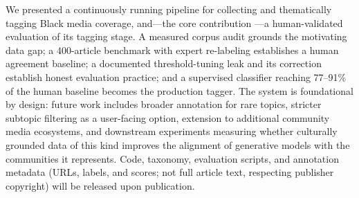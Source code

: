\documentclass[letterpaper,twocolumn,10pt]{article}
\begin{document}
We presented a continuously running pipeline for collecting and
thematically tagging Black media coverage, and---the core contribution
---a human-validated evaluation of its tagging stage. A measured corpus
audit grounds the motivating data gap; a 400-article benchmark with
expert re-labeling establishes a human agreement baseline; a documented
threshold-tuning leak and its correction establish honest evaluation
practice; and a supervised classifier reaching 77--91\% of the human
baseline becomes the production tagger. The system is foundational by
design: future work includes broader annotation for rare topics,
stricter subtopic filtering as a user-facing option, extension to
additional community media ecosystems, and downstream experiments
measuring whether culturally grounded data of this kind improves the
alignment of generative models with the communities it represents. Code,
taxonomy, evaluation scripts, and annotation metadata (URLs, labels, and
scores; not full article text, respecting publisher copyright) will be
released upon publication.
\end{document}
